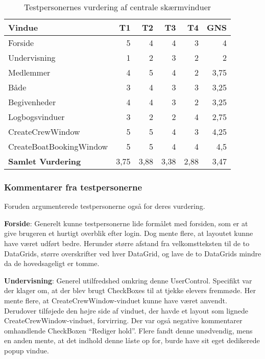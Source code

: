 \begin{table}[htbp]
    \centering
    \caption{Testpersonernes vurdering af centrale skærmvinduer}
    \begin{tabular}{l|rrrr|r}
        \textbf{Vindue} & T1 & T2 & T3 & T4 & \textbf{GNS} \\
        \midrule
        Forside & 5 & 4 & 4 & 3 & 4 \\
        Undervisning & 1 & 2 & 3 & 2 & 2 \\
        Medlemmer & 4 & 5 & 4 & 2 & 3,75 \\
        Både & 3 & 4 & 3 & 3 & 3,25 \\
        Begivenheder & 4 & 4 & 3 & 2 & 3,25 \\
        Logbogsvinduer & 3 & 2 & 2 & 4 & 2,75 \\
        CreateCrewWindow & 5 & 5 & 4 & 3 & 4,25 \\
        CreateBoatBookingWindow & 5 & 5 & 4 & 4 & 4,5 \\ \hline
        \textbf{Samlet Vurdering} & 3,75 & 3,88 & 3,38 & 2,88 & 3,47 \\
    \end{tabular}%
    \label{tab:vurderingtest}%
\end{table}%

\subsubsection*{Kommentarer fra testpersonerne}
Foruden  argumenterede testpersonerne også for deres vurdering.

\textbf{Forside}: 
Generelt kunne testpersonerne lide formålet med forsiden, som er at give brugeren et hurtigt overblik efter login. 
Dog mente flere, at layoutet kunne have været udført bedre.
Herunder større afstand fra velkomstteksten til de to DataGrids, større overskrifter ved hver DataGrid, og lave de to DataGrids mindre da de hovedsageligt er tomme. 

\textbf{Undervisning}: 
Generel utilfredshed omkring denne UserControl.
Specifikt var der klager om, at der blev brugt CheckBoxes til at tjekke elevers fremmøde.
Her mente flere, at CreateCrewWindow-vinduet kunne have været anvendt. 
Derudover tilføjede den højre side af vinduet, der havde et layout som lignede CreateCrewWindow-vinduet, forvirring. 
Der var også negative kommentarer omhandlende CheckBoxen ``Rediger hold''. 
Flere fandt denne unødvendig, mens en anden mente, at det indhold denne låste op for, burde have sit eget dedikerede popup vindue.

